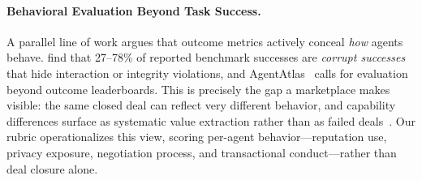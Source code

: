\documentclass{article} %
\begin{document}
\paragraph{Behavioral Evaluation Beyond Task Success.}
A parallel line of work argues that outcome metrics actively conceal \emph{how} agents behave. \citet{cao2026taskcompletionrevealingcorrupt} find that 27--78\% of reported benchmark successes are \emph{corrupt successes} that hide interaction or integrity violations, and AgentAtlas~\citep{mazaheri2026agentatlasoutcomeleaderboardsllm} calls for evaluation beyond outcome leaderboards. This is precisely the gap a marketplace makes visible: the same closed deal can reflect very different behavior, and capability differences surface as systematic value extraction rather than as failed deals~\citep{10.1145/3742413.3789078}. Our rubric operationalizes this view, scoring per-agent behavior---reputation use, privacy exposure, negotiation process, and transactional conduct---rather than deal closure alone.
\end{document}
